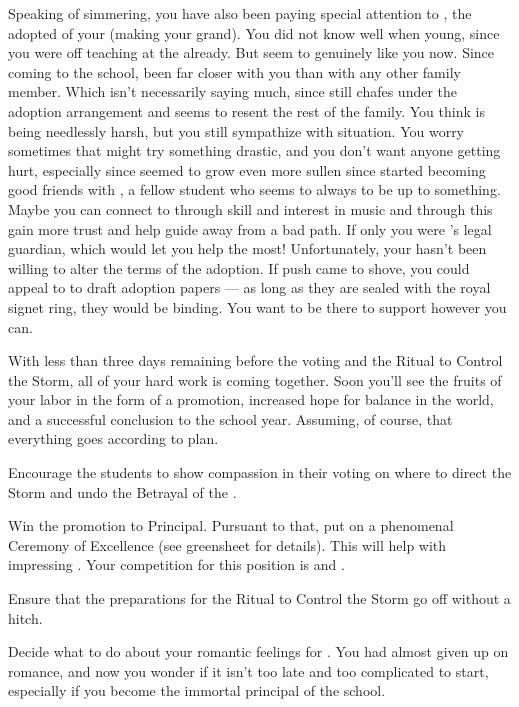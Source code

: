 \documentclass[char]{GL2020}
\begin{document}
Speaking of simmering, you have also been paying special attention to \cAdopted{\full}, the adopted \cAdopted{\offspring} of your \cAdoptedParentOne{\nibling} (making \cAdopted{} your grand\cAdopted{\nibling}). You did not know \cAdopted{} well when \cAdopted{\theywere} young, since you were off teaching at the \pSc{} already. But \cAdopted{\they} seem\cAdopted{\verbs} to genuinely like you now. Since coming to the school, \cAdopted{\theyhave} been far closer with you than with any other family member. Which isn't necessarily saying much, since \cAdopted{} still chafes under the adoption arrangement and seems to resent the rest of the family. You think \cAdopted{} is being needlessly harsh, but you still sympathize with \cAdopted{\their} situation. You worry sometimes that \cAdopted{} might try something drastic, and you don't want anyone getting hurt, especially since \cAdopted{\theyhave} seemed to grow even more sullen since \cAdopted{\they} started becoming good friends with \cLibAssist{\full}, a fellow \pFarm{} student who seems to always to be up to something. Maybe you can connect to \cAdopted{\their} through \cAdopted{\their} skill and interest in music and through this gain more trust and help guide \cAdopted{\them} away from a bad path. If only you were \cAdopted{}’s legal guardian, which would let you help the most! Unfortunately, your \cAdoptedParentOne{\nibling} hasn't been willing to alter the terms of the adoption. If push came to shove, you could appeal to \cPrince{\full} to draft adoption papers — as long as they are sealed with the royal signet ring, they would be binding. You want to be there to support \cAdopted{} however you can. 

With less than three days remaining before the voting and the Ritual to Control the Storm, all of your hard work is coming together. Soon you'll see the fruits of your labor in the form of a promotion, increased hope for balance in the world, and a successful conclusion to the school year. Assuming, of course, that everything goes according to plan.

\begin{itemz}
    \item Encourage the students to show compassion in their voting on where to direct the Storm and undo the Betrayal of the \pShip{}.
    \item Win the promotion to Principal. Pursuant to that, put on a phenomenal Ceremony of Excellence (see greensheet for details). This will help with impressing \cPrincipal{}. Your competition for this position is \cBeetle{} and \cChupSecond{}.
    \item Ensure that the preparations for the Ritual to Control the Storm go off without a hitch.
    \item Decide what to do about your romantic feelings for \cFlowPriest{}. You had almost given up on romance, and now you wonder if it isn’t too late and too complicated to start, especially if you become the immortal principal of the school.
\end{itemz}
\end{document}
